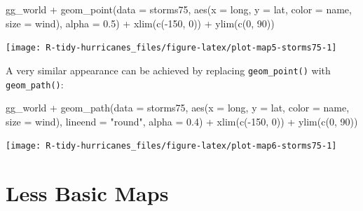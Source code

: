 \documentclass[
]{book}
\newenvironment{Shaded}{\begin{snugshade}}{\end{snugshade}}
\newcommand{\AttributeTok}[1]{\textcolor[rgb]{0.77,0.63,0.00}{#1}}
\newcommand{\DecValTok}[1]{\textcolor[rgb]{0.00,0.00,0.81}{#1}}
\newcommand{\FloatTok}[1]{\textcolor[rgb]{0.00,0.00,0.81}{#1}}
\newcommand{\FunctionTok}[1]{\textcolor[rgb]{0.00,0.00,0.00}{#1}}
\newcommand{\NormalTok}[1]{#1}
\newcommand{\SpecialCharTok}[1]{\textcolor[rgb]{0.00,0.00,0.00}{#1}}
\newcommand{\StringTok}[1]{\textcolor[rgb]{0.31,0.60,0.02}{#1}}
\begin{document}
\begin{Shaded}
\begin{Highlighting}[]
\NormalTok{gg\_world }\SpecialCharTok{+}
  \FunctionTok{geom\_point}\NormalTok{(}\AttributeTok{data =}\NormalTok{ storms75,}
             \FunctionTok{aes}\NormalTok{(}\AttributeTok{x =}\NormalTok{ long, }\AttributeTok{y =}\NormalTok{ lat, }\AttributeTok{color =}\NormalTok{ name, }\AttributeTok{size =}\NormalTok{ wind),}
             \AttributeTok{alpha =} \FloatTok{0.5}\NormalTok{) }\SpecialCharTok{+}
  \FunctionTok{xlim}\NormalTok{(}\FunctionTok{c}\NormalTok{(}\SpecialCharTok{{-}}\DecValTok{150}\NormalTok{, }\DecValTok{0}\NormalTok{)) }\SpecialCharTok{+} 
  \FunctionTok{ylim}\NormalTok{(}\FunctionTok{c}\NormalTok{(}\DecValTok{0}\NormalTok{, }\DecValTok{90}\NormalTok{))}
\end{Highlighting}
\end{Shaded}

\begin{center}\texttt{[image: R-tidy-hurricanes\_files/figure-latex/plot-map5-storms75-1]} \end{center}

A very similar appearance can be achieved by replacing \texttt{geom\_point()} with
\texttt{geom\_path()}:

\begin{Shaded}
\begin{Highlighting}[]
\NormalTok{gg\_world }\SpecialCharTok{+}
  \FunctionTok{geom\_path}\NormalTok{(}\AttributeTok{data =}\NormalTok{ storms75,}
             \FunctionTok{aes}\NormalTok{(}\AttributeTok{x =}\NormalTok{ long, }\AttributeTok{y =}\NormalTok{ lat, }\AttributeTok{color =}\NormalTok{ name, }\AttributeTok{size =}\NormalTok{ wind),}
             \AttributeTok{lineend =} \StringTok{"round"}\NormalTok{, }\AttributeTok{alpha =} \FloatTok{0.4}\NormalTok{) }\SpecialCharTok{+}
  \FunctionTok{xlim}\NormalTok{(}\FunctionTok{c}\NormalTok{(}\SpecialCharTok{{-}}\DecValTok{150}\NormalTok{, }\DecValTok{0}\NormalTok{)) }\SpecialCharTok{+} 
  \FunctionTok{ylim}\NormalTok{(}\FunctionTok{c}\NormalTok{(}\DecValTok{0}\NormalTok{, }\DecValTok{90}\NormalTok{))}
\end{Highlighting}
\end{Shaded}

\begin{center}\texttt{[image: R-tidy-hurricanes\_files/figure-latex/plot-map6-storms75-1]} \end{center}

\hypertarget{less-basic-maps}{%
\chapter{Less Basic Maps}\label{less-basic-maps}}
\end{document}
